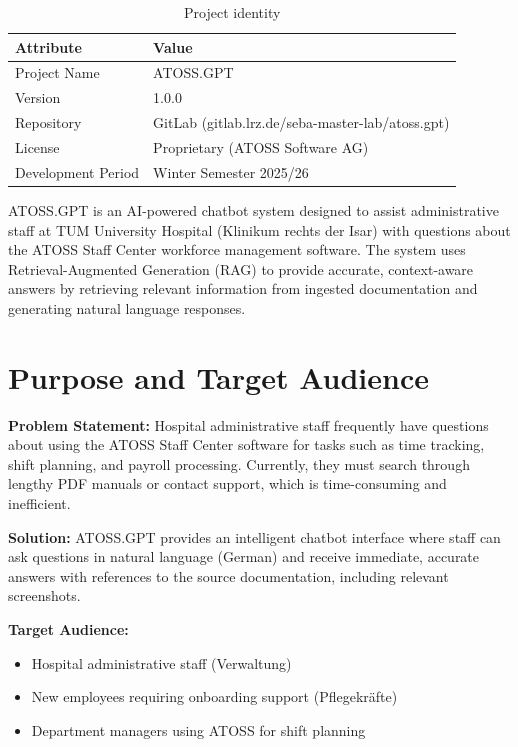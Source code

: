 \documentclass[a4paper,12pt]{report}
\begin{document}
\begin{table}[H]
\centering
\begin{tabularx}{0.8\textwidth}{lX}
    \toprule
    \textbf{Attribute} & \textbf{Value} \\
    \midrule
    Project Name & ATOSS.GPT \\
    Version & 1.0.0 \\
    Repository & GitLab (gitlab.lrz.de/seba-master-lab/atoss.gpt) \\
    License & Proprietary (ATOSS Software AG) \\
    Development Period & Winter Semester 2025/26 \\
    \bottomrule
\end{tabularx}
\caption{Project identity}
\label{tab:project-identity}
\end{table}

ATOSS.GPT is an AI-powered chatbot system designed to assist administrative staff at TUM University Hospital (Klinikum rechts der Isar) with questions about the ATOSS Staff Center workforce management software. The system uses Retrieval-Augmented Generation (RAG) to provide accurate, context-aware answers by retrieving relevant information from ingested documentation and generating natural language responses.

\section{Purpose and Target Audience}

\textbf{Problem Statement:} Hospital administrative staff frequently have questions about using the ATOSS Staff Center software for tasks such as time tracking, shift planning, and payroll processing. Currently, they must search through lengthy PDF manuals or contact support, which is time-consuming and inefficient.

\textbf{Solution:} ATOSS.GPT provides an intelligent chatbot interface where staff can ask questions in natural language (German) and receive immediate, accurate answers with references to the source documentation, including relevant screenshots.

\textbf{Target Audience:}
\begin{itemize}
    \item Hospital administrative staff (Verwaltung)
    \item New employees requiring onboarding support (Pflegekr\"afte)
    \item Department managers using ATOSS for shift planning
\end{itemize}
\end{document}
